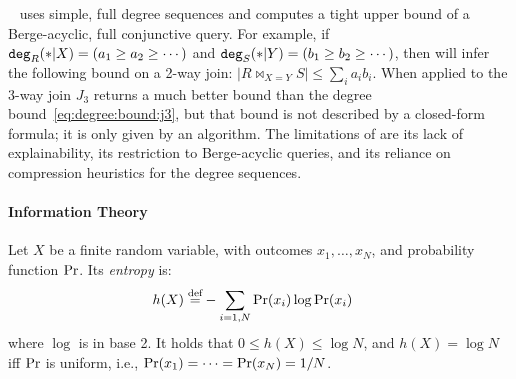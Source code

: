 \safebound~\cite{DBLP:conf/icdt/DeedsSBC23,SafeBound:SIGMOD23}
uses simple, full degree sequences and computes a tight upper bound of
a Berge-acyclic, full conjunctive query.  For example, if
$\texttt{deg}_R(*|X)=(a_1\geq a_2 \geq \cdots)$ and
$\texttt{deg}_S(*|Y)=(b_1\geq b_2 \geq \cdots)$, then \safebound will infer
the following bound on a 2-way join:
$|R \Join_{X=Y} S| \leq \sum_i a_ib_i$.  When applied to the 3-way
join $J_3$ \safebound returns a much better bound than the degree
bound~\eqref{eq:degree:bound:j3}, but that bound is not described by a
closed-form formula; it is only given by an algorithm.  The
limitations of \safebound are its lack of explainability, its
restriction to Berge-acyclic queries, and its reliance on 
compression heuristics for the degree sequences.

\paragraph{Information Theory} Let $X$ be a finite random
variable, with outcomes $x_1, \ldots, x_N$, and probability function
$\mathop{\textnormal{Pr}}$.  Its \emph{entropy} is:
%
\begin{align*}
  h(X) \stackrel{\text{def}}{=} & - \sum_{i=1,N} \mathop{\textnormal{Pr}}(x_i) \log \mathop{\textnormal{Pr}}(x_i)
\end{align*}
%
where $\log$ is in base 2.  It holds that $0 \leq h(X) \leq \log N$,
and $h(X)=\log N$ iff $\mathop{\textnormal{Pr}}$ is uniform, i.e.,
$\mathop{\textnormal{Pr}}(x_1)=\cdots=\mathop{\textnormal{Pr}}(x_N)=1/N$.


